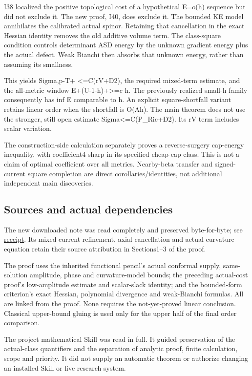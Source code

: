 \documentclass[
  10pt,
]{article}
\begin{document}
I38 localized the positive topological cost of a hypothetical E=o(h)
sequence but did not exclude it. The new proof, I40, does exclude it.
The bounded KE model annihilates the calibrated actual spinor. Retaining
that cancellation in the exact Hessian identity removes the old additive
volume term. The class-square condition controls determinant ASD energy
by the unknown gradient energy plus the actual defect. Weak Bianchi then
absorbs that unknown energy, rather than assuming its smallness.

This yields Sigma,p-T+ \textless=C(rV+D2), the required mixed-term
estimate, and the all-metric window E+(U-1-h)+\textgreater=c h. The
previously realized small-h family consequently has inf E comparable to
h. An explicit square-shortfall variant retains linear order when the
shortfall is O(Ah). The main theorem does not use the stronger, still
open estimate Sigma\textless=C(P\_Ric+D2). Its rV term includes scalar
variation.

The construction-side calculation separately proves a reverse-surgery
cap-energy inequality, with coefficient4 sharp in its specified
cheap-cap class. This is not a claim of optimal coefficient over all
metrics. Nearby-beta transfer and signed-current square completion are
direct corollaries/identities, not additional independent main
discoveries.

\hypertarget{sources-and-actual-dependencies}{%
\subsection{Sources and actual
dependencies}\label{sources-and-actual-dependencies}}

The new downloaded note was read completely and preserved byte-for-byte;
see
\href{../guidance/source/20260927_mixed_current_receipt.json}{receipt}.
Its mixed-current refinement, axial cancellation and actual curvature
equation retain their source attribution in Sections1--3 of the proof.

The proof uses the inherited functional pencil's actual conformal
supply, same-solution amplitude, phase and curvature-model bounds; the
preceding actual-cost proof's low-amplitude estimate and scalar-slack
identity; and the bounded-form criterion's exact Hessian, polynomial
divergence and weak-Bianchi formulas. All are linked from the proof.
None requires the not-yet-proved linear conclusion. Classical
upper-bound gluing is used only for the upper half of the final order
comparison.

The project mathematical Skill was read in full. It guided preservation
of the actual-class quantifiers and the separation of analytic proof,
finite calculation, scope and priority. It did not supply an automatic
theorem or authorize changing an installed Skill or live research
system.
\end{document}
